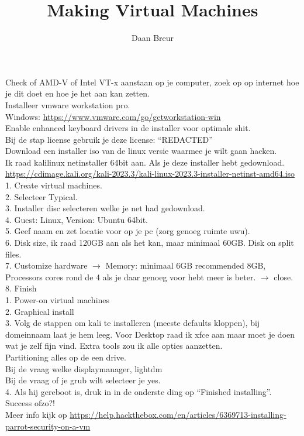 \documentclass{article}
\author{Daan Breur}
\title{Making Virtual Machines}
\makeatletter
\newcommand{\problem}[2]{\noindent\llap{#1.\space}#2}
\def\makeheader{%
\par\noindent{\large\begin{tabular}{@{}l@{}}
\@author \\
\@classname
\end{tabular}}\par\nobreak\vskip20pt
\noindent{\bfseries\LARGE\@title\par}\bigskip
}
\makeatother
\begin{document}
\makeheader
\problem{Pre-requirements}
Check of AMD-V of Intel VT-x aanstaan op je computer, zoek op op internet hoe je dit doet en hoe je het aan kan zetten.\\

\problem{A}
Installeer vmware workstation pro. \\
Windows: \url{https://www.vmware.com/go/getworkstation-win} \\
Enable enhanced keyboard drivers in de installer voor optimale shit. \\
Bij de stap license gebruik je deze license: ``REDACTED''\\

\problem{B}
Download een installer iso van de linux versie waarmee je wilt gaan hacken.\\
Ik raad kalilinux netinstaller 64bit aan. Als je deze installer hebt gedownload.\\
\url{https://cdimage.kali.org/kali-2023.3/kali-linux-2023.3-installer-netinst-amd64.iso}\\

\problem{C}
1. Create virtual machines.\\
2. Selecteer Typical.\\
3. Installer disc selecteren welke je net had gedownload.\\
4. Guest: Linux, Version: Ubuntu 64bit.\\
5. Geef naam en zet locatie voor op je pc (zorg genoeg ruimte uwu).\\
6. Disk size, ik raad 120GB aan als het kan, maar minimaal 60GB. Disk on split files.\\
7. Customize hardware $\rightarrow$ Memory: minimaal 6GB recommended 8GB, Processors cores rond de 4 als je daar genoeg voor hebt meer is beter. $\rightarrow$ close.
8. Finish\\

\newpage
\problem{D}
1. Power-on virtual machines\\
2. Graphical install\\
3. Volg de stappen om kali te installeren (meeste defaults kloppen), bij domeinnaam laat je hem leeg. Voor Desktop raad ik xfce aan maar moet je doen wat je zelf fijn vind. Extra tools zou ik alle opties aanzetten.\\
Partitioning alles op de een drive.\\
Bij de vraag welke displaymanager, lightdm\\
Bij de vraag of je grub wilt selecteer je yes.\\
4. Als hij gereboot is, druk in in de onderste ding op ``Finished installing''.\\

\problem{E}
Success ofzo?!\\
Meer info kijk op \url{https://help.hackthebox.com/en/articles/6369713-installing-parrot-security-on-a-vm}\\
\end{document}
